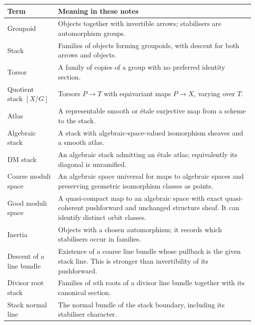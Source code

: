 \documentclass[11pt,a4paper]{article}
\numberwithin{equation}{section}
\theoremstyle{definition}
\begin{document}
\begin{longtable}{@{}p{}p{}@{}}
\toprule
Term & Meaning in these notes\\
\midrule
\endhead
Groupoid & Objects together with invertible arrows; stabilisers are automorphism groups.\\
Stack & Families of objects forming groupoids, with descent for both arrows and objects.\\
Torsor & A family of copies of a group with no preferred identity section.\\
Quotient stack $[X/G]$ & Torsors $P\to T$ with equivariant maps $P\to X$, varying over $T$.\\
Atlas & A representable smooth or étale surjective map from a scheme to the stack.\\
Algebraic stack & A stack with algebraic-space-valued isomorphism sheaves and a smooth atlas.\\
DM stack & An algebraic stack admitting an étale atlas; equivalently its diagonal is unramified.\\
Coarse moduli space & An algebraic space universal for maps to algebraic spaces and preserving geometric isomorphism classes as points.\\
Good moduli space & A quasi-compact map to an algebraic space with exact quasi-coherent pushforward and unchanged structure sheaf. It can identify distinct orbit classes.\\
Inertia & Objects with a chosen automorphism; it records which stabilisers occur in families.\\
Descent of a line bundle & Existence of a coarse line bundle whose pullback is the given stack line. This is stronger than invertibility of its pushforward.\\
Divisor root stack & Families of $n$th roots of a divisor line bundle together with its canonical section.\\
Stack normal line & The normal bundle of the stack boundary, including its stabiliser character.\\
\bottomrule
\end{longtable}
\end{document}
